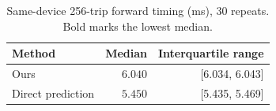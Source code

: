 \begin{table}[t]
\centering\footnotesize\setlength{\tabcolsep}{4pt}
\caption{Same-device 256-trip forward timing (ms), 30 repeats. Bold marks the lowest median.}\label{tab:efficiency}
\begin{tabular}{lrr}\toprule
Method & Median & Interquartile range\\\midrule
Ours & $6.040$ & [6.034, 6.043]\\
Direct prediction & $\mathbf{5.450}$ & [5.435, 5.469]\\
\bottomrule\end{tabular}
\end{table}
